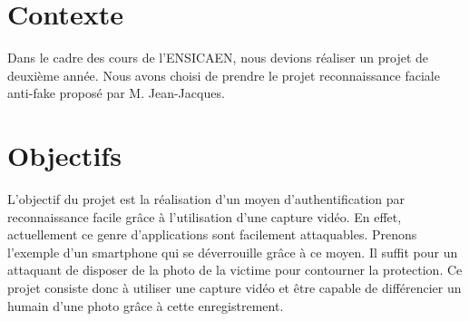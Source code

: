 \section{Contexte}

Dans le cadre des cours de l'ENSICAEN, nous devions réaliser un projet de deuxième année. Nous avons choisi de prendre le projet reconnaissance faciale anti-fake proposé
par M.  Jean-Jacques. 

\section{Objectifs}

L'objectif du projet est la réalisation d'un moyen d'authentification par reconnaissance facile grâce à l'utilisation d'une capture vidéo. En effet, actuellement ce genre d'applications sont facilement 
attaquables. Prenons l'exemple d'un smartphone qui se déverrouille grâce à ce moyen. Il suffit pour un attaquant de disposer de la photo de la victime pour contourner la protection. Ce projet consiste donc 
à utiliser une capture vidéo et être capable de différencier un humain d'une photo grâce à cette enregistrement. 
